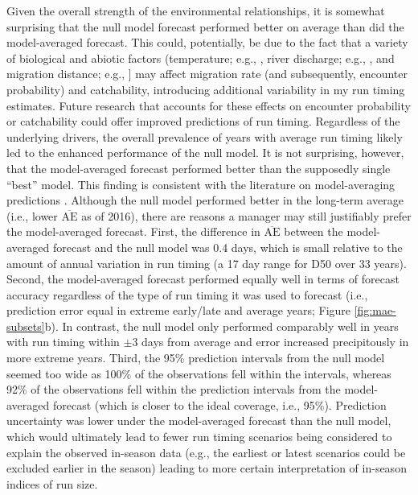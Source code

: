 \documentclass[12pt,]{book}
\theoremstyle{definition}
\theoremstyle{definition}
\theoremstyle{definition}
\theoremstyle{remark}
\begin{document}
Given the overall strength of the environmental relationships, it is
somewhat surprising that the null model forecast performed better on
average than did the model-averaged forecast. This could, potentially,
be due to the fact that a variety of biological \citetext{\citealp[size;
e.g.,][ and morphology]{bromaghin-2005}; \citealp{hamon-etal-2000}} and
abiotic factors (temperature; e.g., \citet{salinger-anderson-2006},
river discharge; e.g., \citet{keefer-etal-2004}, and migration distance;
e.g., \citet{eiler-etal-2015}{]} may affect migration rate (and
subsequently, encounter probability) and catchability, introducing
additional variability in my run timing estimates. Future research that
accounts for these effects on encounter probability or catchability
could offer improved predictions of run timing. Regardless of the
underlying drivers, the overall prevalence of years with average run
timing likely led to the enhanced performance of the null model. It is
not surprising, however, that the model-averaged forecast performed
better than the supposedly single ``best'' model. This finding is
consistent with the literature on model-averaging predictions
\citep{burnham-anderson-2004}. Although the null model performed better
in the long-term average (i.e., lower \(\overline{\text{AE}}\) as of
2016), there are reasons a manager may still justifiably prefer the
model-averaged forecast. First, the difference in
\(\overline{\text{AE}}\) between the model-averaged forecast and the
null model was 0.4 days, which is small relative to the amount of annual
variation in run timing (a 17 day range for D50 over 33 years). Second,
the model-averaged forecast performed equally well in terms of forecast
accuracy regardless of the type of run timing it was used to forecast
(i.e., prediction error equal in extreme early/late and average years;
Figure \ref{fig:mae-subsets}b). In contrast, the null model only
performed comparably well in years with run timing within \(\pm 3\) days
from average and error increased precipitously in more extreme years.
Third, the 95\% prediction intervals from the null model seemed too wide
as 100\% of the observations fell within the intervals, whereas 92\% of
the observations fell within the prediction intervals from the
model-averaged forecast (which is closer to the ideal coverage, i.e.,
95\%). Prediction uncertainty was lower under the model-averaged
forecast than the null model, which would ultimately lead to fewer run
timing scenarios being considered to explain the observed in-season data
(e.g., the earliest or latest scenarios could be excluded earlier in the
season) leading to more certain interpretation of in-season indices of
run size.
\end{document}
